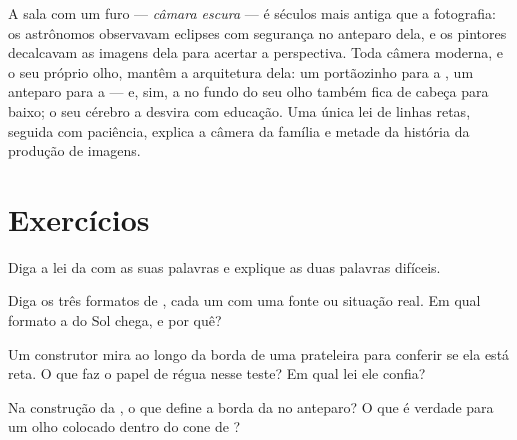 \begin{remark}\label{rem:g6:light-propagation:history}
A sala com um furo --- \emph{câmara escura} --- é séculos mais antiga
que a fotografia: os astrônomos observavam eclipses com segurança no
anteparo dela, e os pintores decalcavam as imagens dela para acertar
a perspectiva. Toda câmera moderna, e o seu próprio olho, mantêm a
arquitetura dela: um portãozinho para a , um anteparo para a
 --- e, sim, a  no fundo do seu olho também fica de
cabeça para baixo; o seu cérebro a desvira com educação. Uma única
lei de linhas retas, seguida com paciência, explica a câmera da
família e metade da história da produção de imagens.
\end{remark}

\section{Exercícios}

\begin{exercise}[$\star$]\label{exo:g6:light-propagation:1}
Diga a lei da  com as suas palavras e explique as
duas palavras difíceis.
\end{exercise}

\begin{exercise}[$\star$]\label{exo:g6:light-propagation:2}
Diga os três formatos de , cada um com uma fonte ou situação
real. Em qual formato a  do Sol chega, e por quê?
\end{exercise}

\begin{exercise}[$\star$]\label{exo:g6:light-propagation:3}
Um construtor mira ao longo da borda de uma prateleira para conferir
se ela está reta. O que faz o papel de régua nesse teste? Em qual lei
ele confia?
\end{exercise}

\begin{exercise}[$\star$]\label{exo:g6:light-propagation:4}
Na construção da , o que define a borda da  no anteparo?
O que é verdade para um olho colocado dentro do cone de ?
\end{exercise}

